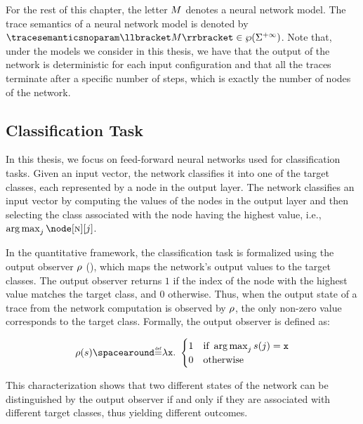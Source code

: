 For the rest of this chapter, the letter $M$ denotes a neural network model. The trace semantics of a neural network model is denoted by $\tracesemanticsnoparam\semanticsof{\defmodel}\in\tracetype$.
Note that, under the models we consider in this thesis, we have that the output of the network is deterministic for each input configuration and that all the traces terminate after a specific number of steps, which is exactly the number of nodes of the network.

\subsection{Classification Task}

In this thesis, we focus on feed-forward neural networks used for classification tasks. Given an input vector, the network classifies it into one of the target classes, each represented by a node in the output layer. The network classifies an input vector by computing the values of the nodes in the output layer and then selecting the class associated with the node having the highest value, i.e., $\argmax_{j} \node[\lastlayerindex][j]$.

In the quantitative framework, the classification task is formalized using the output observer $\rho$ (), which maps the network's output values to the target classes. The output observer returns $1$ if the index of the node with the highest value matches the target class, and $0$ otherwise. Thus, when the output state of a trace from the network computation is observed by $\rho$, the only non-zero value corresponds to the target class. Formally, the output observer is defined as:

\begin{align*}
\outputobs(\defstate) \DefeQ \lambda \defvariable.\spacer
\begin{cases}
1 & \text{if } \argmax_{j} \defstate(j) = \defvariable \\
0 & \text{otherwise}
\end{cases}
\end{align*}

This characterization shows that two different states of the network can be distinguished by the output observer if and only if they are associated with different target classes, thus yielding different outcomes.

